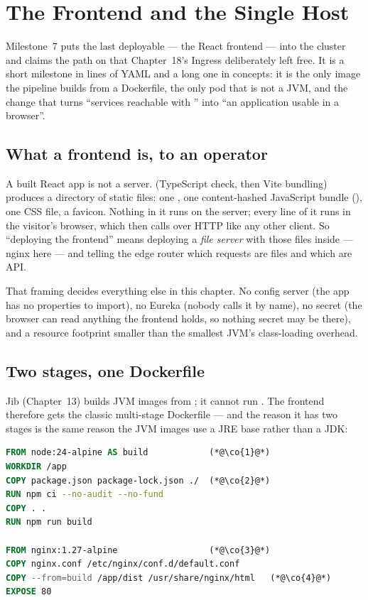\chapter{The Frontend and the Single Host}
\label{ch:frontend}

Milestone~7 puts the last deployable --- the React frontend --- into
the cluster and claims the \code{/} path on  that
Chapter~18's Ingress deliberately left free. It is a short milestone
in lines of YAML and a long one in concepts: it is the only image the
pipeline builds from a Dockerfile, the only pod that is not a JVM, and
the change that turns ``services reachable with '' into
``an application usable in a browser''.

\section{What a frontend is, to an operator}

A built React app is not a server.  (TypeScript
check, then Vite bundling) produces a directory of static files:
one , one content-hashed JavaScript bundle
(), one CSS file, a favicon. Nothing in it
runs on the server; every line of it runs in the visitor's browser,
which then calls  over HTTP like any other client. So
``deploying the frontend'' means deploying a \emph{file server} with
those files inside --- nginx here --- and telling the edge router which
requests are files and which are API.

That framing decides everything else in this chapter. No config
server (the app has no properties to import), no Eureka (nobody calls
it by name), no secret (the browser can read anything the frontend
holds, so nothing secret may be there), and a resource footprint
smaller than the smallest JVM's class-loading overhead.

\section{Two stages, one Dockerfile}

Jib (Chapter~13) builds JVM images from ; it
cannot run . The frontend therefore gets the classic
multi-stage Dockerfile --- and the reason it has two stages is the same
reason the JVM images use a JRE base rather than a JDK:

\begin{lstlisting}[language=dockerfile]
FROM node:24-alpine AS build            (*@\co{1}@*)
WORKDIR /app
COPY package.json package-lock.json ./  (*@\co{2}@*)
RUN npm ci --no-audit --no-fund
COPY . .
RUN npm run build

FROM nginx:1.27-alpine                  (*@\co{3}@*)
COPY nginx.conf /etc/nginx/conf.d/default.conf
COPY --from=build /app/dist /usr/share/nginx/html   (*@\co{4}@*)
EXPOSE 80
\end{lstlisting}

